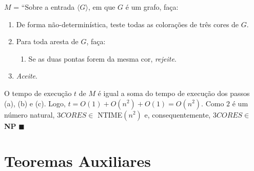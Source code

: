 \documentclass[12pt,a4paper,oneside]{article}
\begin{document}
\begin{enumerate}
{		$M$ = ``Sobre a entrada $\langle G \rangle$, em que $G$ é um grafo, faça:
		\begin{enumerate}
			\item De forma não-determinística, teste todas as colorações de três cores de $G$.
			\item Para toda aresta de $G$, faça:
				\begin{enumerate}
					\item Se as duas pontas forem da mesma cor, {\it rejeite}.
				\end{enumerate}
			\item {\it Aceite}. 
		\end{enumerate}
		
		O tempo de execução $t$ de $M$ é igual a soma do tempo de execução dos passos (a), (b) e (c). Logo, $t = O(1) + O(n^2) + O(1) = O(n^2)$. Como $2$ é um número natural, $3CORES \in$ {\sc NTIME}$(n^2)$ e, consequentemente, $3CORES \in$ {\bf NP} $\blacksquare$
	}

\end{enumerate}

\section*{Teoremas Auxiliares}
\end{document}
